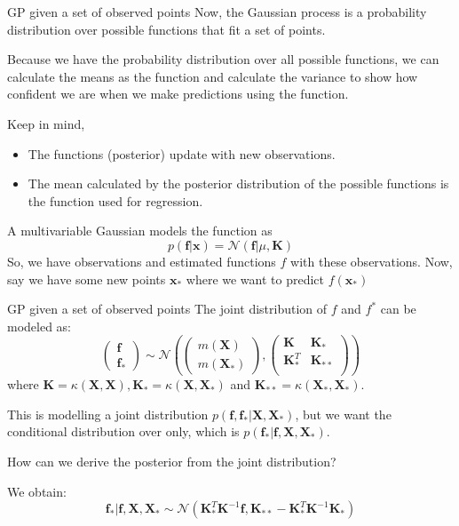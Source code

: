 \documentclass[10pt]{beamer}
\begin{document}
\begin{frame}{GP given a set of observed points}
	Now,  the Gaussian process is a probability distribution over possible functions that fit a set of points.
	
	Because we have the probability distribution over all possible functions, we can calculate the means as the function and calculate the variance to show how confident we are when we make predictions using the function.
	
	Keep in mind, 
	\begin{itemize}
		\item The functions (posterior) update with new observations. 
		\item The mean calculated by the posterior distribution of the possible functions is the function used for regression.
	\end{itemize}
	A multivariable Gaussian models the function as 
	$$ p(\mathbf{f}| \mathbf{x}) = \mathcal{N} (\mathbf{f}| \mu, \mathbf{K})$$
	So, we have observations and estimated functions $f$ with these observations. Now, say we have some new points $\mathbf{x}_*$ where we want to predict $f(\mathbf{x}_*)$
\end{frame}

\begin{frame}{GP given a set of observed points}
	The joint distribution of $f$ and $f^*$ can be modeled as: 
	$$\left(\begin{array}{r}
		\mathbf{f}\\ 
		\mathbf{f}_*
	\end{array}\right) \sim \mathcal{N} \left(\left(\begin{array}{r}
		m(\mathbf{X}) \\ 
		m(\mathbf{X}_*) 
	\end{array}\right), \left(\begin{array}{rr}
		\mathbf{K}& \mathbf{K}_* \\ 
		\mathbf{K}_*^T& \mathbf{K}_{**} \\
	\end{array}\right)\right)$$
	where $\mathbf{K} = \kappa (\mathbf{X}, \mathbf{X}), \mathbf{K}_* = \kappa (\mathbf{X}, \mathbf{X}_*)$ and $\mathbf{K}_{**} = \kappa (\mathbf{X}_*, \mathbf{X}_*)$. 
	
	This is modelling a joint distribution $p(\mathbf{f}, \mathbf{f}_*|\mathbf{X}, \mathbf{X}_*)$, but we want the conditional distribution over only, which is $p(\mathbf{f}_*| \mathbf{f}, \mathbf{X}, \mathbf{X}_*)$. 
	
	How can we derive the posterior from the joint distribution? 
	
	We obtain: $$ \mathbf{f}_*| \mathbf{f}, \mathbf{X}, \mathbf{X}_* \sim \mathcal{N} \left(\mathbf{K}_*^T \mathbf{K}^{-1} \mathbf{f}, \mathbf{K}_{**} - \mathbf{K}^T_* \mathbf{K}^{-1} \mathbf{K}_*\right)$$
\end{frame}
\end{document}
